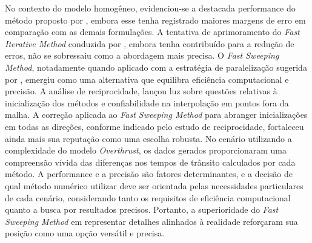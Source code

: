 No contexto do modelo homogêneo, evidenciou-se a destacada performance do método proposto por , embora esse tenha registrado maiores margens de erro em comparação com as demais formulações. A tentativa de aprimoramento do \textit{Fast Iterative Method} conduzida por , embora tenha contribuído para a redução de erros, não se sobressaiu como a abordagem mais precisa.  O \textit{Fast Sweeping Method}, notadamente quando aplicado com a estratégia de paralelização sugerida por , emergiu como uma alternativa que equilibra eficiência computacional e precisão. A análise de reciprocidade, lançou luz sobre questões relativas à inicialização dos métodos e confiabilidade na interpolação em pontos fora da malha. A correção aplicada ao \textit{Fast Sweeping Method} para abranger inicializações em todas as direções, conforme indicado pelo estudo de reciprocidade, fortaleceu ainda mais sua reputação como uma escolha robusta. No cenário utilizando a complexidade do modelo \textit{Overthrust}, os dados gerados proporcionaram uma compreensão vívida das diferenças nos tempos de trânsito calculados por cada método. A performance e a precisão são fatores determinantes, e a decisão de qual método numérico utilizar deve ser orientada pelas necessidades particulares de cada cenário, considerando tanto os requisitos de eficiência computacional quanto a busca por resultados precisos. Portanto, a superioridade do \textit{Fast Sweeping Method} em representar detalhes alinhados à realidade reforçaram sua posição como uma opção versátil e precisa. 




